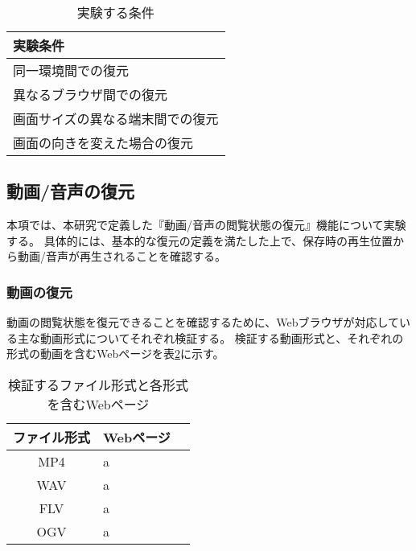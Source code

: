 
\begin{table}[htbp]
  \label{tb:evl-basic-conditions}
  \caption{実験する条件}
  \begin{center}
    \begin{tabular}{|l|}
    \hline
    実験条件  \\ \hline
    同一環境間での復元 \\ \hline
    異なるブラウザ間での復元 \\ \hline
    画面サイズの異なる端末間での復元 \\ \hline
    画面の向きを変えた場合の復元 \\ \hline
    \end{tabular}
  \end{center}
\end{table}

\subsection{動画/音声の復元}
本項では、本研究で定義した『動画/音声の閲覧状態の復元』機能について実験する。
具体的には、基本的な復元の定義を満たした上で、保存時の再生位置から動画/音声が再生されることを確認する。

\subsubsection{動画の復元}
動画の閲覧状態を復元できることを確認するために、Webブラウザが対応している主な動画形式についてそれぞれ検証する。
検証する動画形式と、それぞれの形式の動画を含むWebページを表\ref{tb:evl-video-check-list}に示す。

\begin{table}[htbp]
  \begin{center}
    \caption{検証するファイル形式と各形式を含むWebページ}
    \label{tb:evl-video-check-list}
    \begin{tabular}{|c|l|l|}
      \hline
      ファイル形式 & Webページ \\\hline\hline
      MP4 & a \\\hline
      WAV & a \\\hline
      FLV & a \\\hline
      OGV & a \\\hline
    \end{tabular}
  \end{center}
\end{table}

